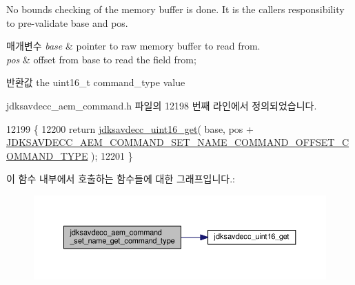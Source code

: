 No bounds checking of the memory buffer is done. It is the caller\textquotesingle{}s responsibility to pre-\/validate base and pos.


\begin{DoxyParams}{매개변수}
{\em base} & pointer to raw memory buffer to read from. \\
\hline
{\em pos} & offset from base to read the field from; \\
\hline
\end{DoxyParams}
\begin{DoxyReturn}{반환값}
the uint16\+\_\+t command\+\_\+type value 
\end{DoxyReturn}


jdksavdecc\+\_\+aem\+\_\+command.\+h 파일의 12198 번째 라인에서 정의되었습니다.


\begin{DoxyCode}
12199 \{
12200     \textcolor{keywordflow}{return} \hyperlink{group__endian_ga3fbbbc20be954aa61e039872965b0dc9}{jdksavdecc\_uint16\_get}( base, pos + 
      \hyperlink{group__command__set__name_ga50d48d963d6ce083bf3d656e450a6ca4}{JDKSAVDECC\_AEM\_COMMAND\_SET\_NAME\_COMMAND\_OFFSET\_COMMAND\_TYPE}
       );
12201 \}
\end{DoxyCode}


이 함수 내부에서 호출하는 함수들에 대한 그래프입니다.\+:
\nopagebreak
\begin{figure}[H]
\begin{center}
\leavevmode
\includegraphics[width=350pt]{group__command__set__name_ga57baf2a92f476b2fe6b5b9b677bf9927_cgraph}
\end{center}
\end{figure}


